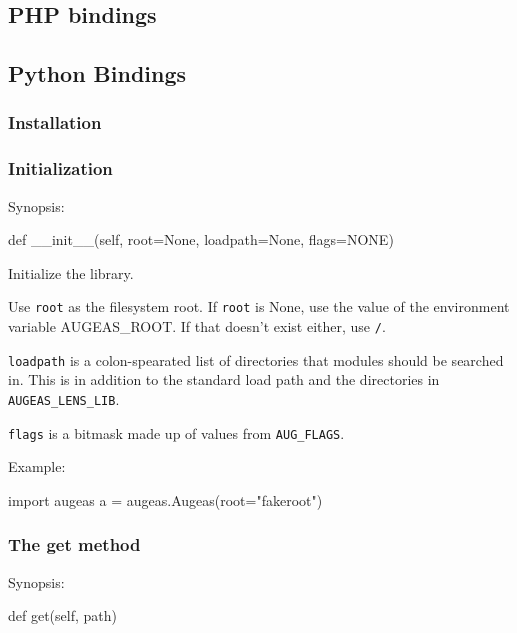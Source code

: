 
\subsection{PHP bindings}


\subsection{Python Bindings}


\subsubsection{Installation}

\subsubsection{Initialization}

Synopsis:

\begin{python}[]
    def __init__(self, root=None, loadpath=None, flags=NONE)
\end{python}

Initialize the library.

Use \verb!root! as the filesystem root. If \verb!root! is None, use the value of the environment variable AUGEAS\_ROOT. If that doesn't exist either, use \nolinkurl{/}.

\verb!loadpath! is a colon-spearated list of directories that modules should be searched in. This is in addition to the standard load path and the directories in \verb!AUGEAS_LENS_LIB!.

\verb!flags! is a bitmask made up of values from \verb!AUG_FLAGS!.

Example:

\begin{python}[]
    import augeas
    a = augeas.Augeas(root="fakeroot")
\end{python}

\subsubsection{The get method}

Synopsis:

\begin{python}[]
    def get(self, path)
\end{python}

